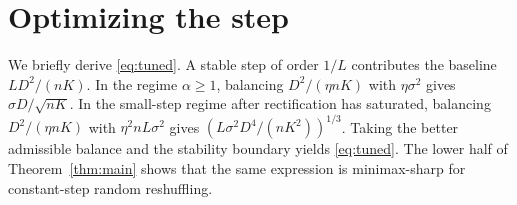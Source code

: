 \documentclass{article}
\theoremstyle{remark}
\newcommand{\1}{\mathbf 1}
\begin{document}
\section{Optimizing the step}\label{app:tuning}

We briefly derive \eqref{eq:tuned}. A stable step of order $1/L$ contributes the baseline $LD^2/(nK)$. In the regime $\alpha\geq1$, balancing $D^2/(\eta nK)$ with $\eta\sigma^2$ gives $\sigma D/\sqrt{nK}$. In the small-step regime after rectification has saturated, balancing $D^2/(\eta nK)$ with $\eta^2nL\sigma^2$ gives $(L\sigma^2D^4/(nK^2))^{1/3}$. Taking the better admissible balance and the stability boundary yields \eqref{eq:tuned}. The lower half of Theorem~\ref{thm:main} shows that the same expression is minimax-sharp for constant-step random reshuffling.
\end{document}
